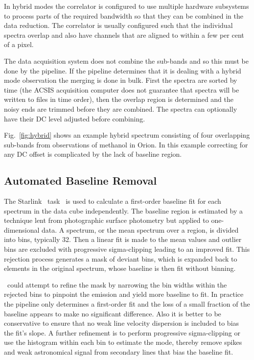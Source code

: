 \documentclass[final,authoryear,5p,times,twocolumn]{elsarticle}
\begin{document}
In hybrid modes the correlator is configured to use multiple
hardware subsystems to process parts of the required bandwidth so
that they can be combined in the data reduction. The correlator is
usually configured such that the individual spectra overlap and also
have channels that are aligned to within a few per cent of a pixel.

The data acquisition system does not combine the sub-bands and so this
must be done by the pipeline. If the pipeline determines that it is
dealing with a hybrid mode observation the merging is done in
bulk. First the spectra are sorted by time (the ACSIS acquisition
computer does not guarantee that spectra will be written to files in
time order), then the overlap region is determined and the noisy ends
are trimmed before they are combined. The spectra can optionally have
their DC level adjusted before combining.

Fig.\ \ref{fig:hybrid} shows an example hybrid spectrum consisting of
four overlapping sub-bands from observations of methanol in Orion. In this
example correcting for any DC offset is complicated by the lack of
baseline region.

\subsection{Automated Baseline Removal}
\label{sec:mfittrend}

The Starlink \KAPPA\ task \mfittrend\ is used to calculate a
first-order baseline fit for each spectrum in the data cube
independently. The baseline region is estimated by a technique lent
from photographic surface photometry \citep{1998A&AS..127..367Y} but applied to one-dimensional
data.  A spectrum, or the mean spectrum over a region, is divided into
bins, typically 32.  Then a linear fit is made to the mean values and
outlier bins are excluded with progressive sigma-clipping leading to
an improved fit.  This rejection process generates a mask of deviant
bins, which is expanded back to elements in the original spectrum,
whose baseline is then fit without binning.

\mfittrend\ could attempt to refine the mask by narrowing the bin
widths within the rejected bins to pinpoint the emission and yield
more baseline to fit.  In practice the pipeline only determines a
first-order fit and the loss of a small fraction of the baseline
appears to make no significant difference.  Also it is better to be
conservative to ensure that no weak line velocity dispersion is
included to bias the fit's slope.  A further refinement is to perform
progressive sigma-clipping or use the histogram within each bin to
estimate the mode, thereby remove spikes and weak astronomical signal
from secondary lines that bias the baseline fit.
\end{document}
